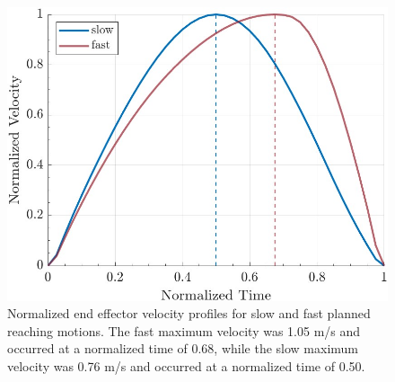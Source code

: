 \documentclass[letterpaper, 10pt, conference]{ieeeconf}
\begin{document}

\begin{figure}[h]
    \centering
    \includegraphics[width=1\linewidth]{images/single_slow_fast.jpg}
    \caption{Normalized end effector velocity profiles for slow and fast planned reaching motions. The fast maximum velocity was 1.05 m/s and occurred at a normalized time of 0.68, while the slow maximum velocity was 0.76 m/s and occurred at a normalized time of 0.50.}
    \label{fig:VelocityFeedforward}
\end{figure}
\end{document}
